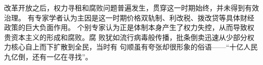 改革开放之后，权力寻租和腐败问题普遍发生，贯穿这一时期始终，并未得到有效治理。
有专家学者认为主因是这一时期价格双轨制、利改税、拨改贷等具体财经政策的巨大负面作用。
个别专家认为正是体制本身产生了权力失控，从而导致权贵资本主义的形成和腐败。腐
败犹如流行病毒般传播，批条倒卖迅速从少部分权力核心自上而下扩散到全民，当时有
句顺虽有夸张却很形象的俗语——“十亿人民九亿倒，还有一亿在寻找”。


















